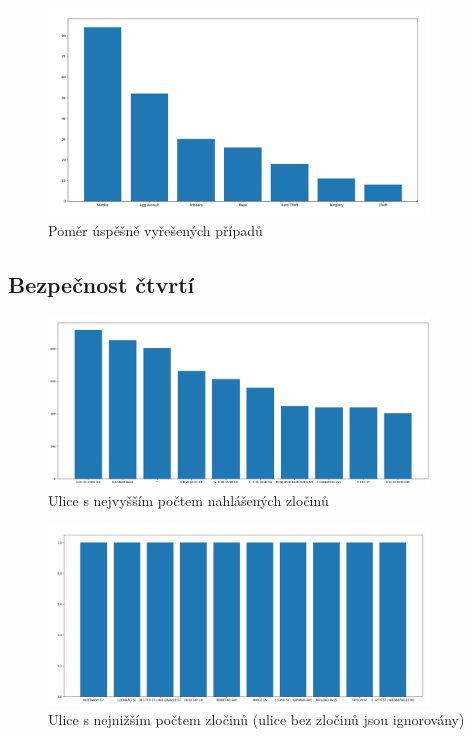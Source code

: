 \documentclass{article}
\begin{document}
\begin{figure}
  \centering
  \includegraphics[width=0.9\textwidth]{figures/solved_percentage.png}
  \caption{Poměr úspěšně vyřešených případů}
\end{figure}

\subsection{Bezpečnost čtvrtí}

\begin{figure}
  \centering
  \includegraphics[width=0.9\textwidth]{figures/worst_streets.png}
  \caption{Ulice s nejvyšším počtem nahlášených zločinů}
\end{figure}

\begin{figure}
  \centering
  \includegraphics[width=0.9\textwidth]{figures/safest_streets.png}
  \caption{Ulice s nejnižším počtem zločinů (ulice bez zločinů jsou ignorovány)}
\end{figure}
\end{document}
